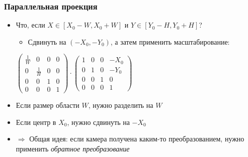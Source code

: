 \documentclass[10pt]{beamer}
\begin{document}
\begin{frame}[fragile]
\frametitle{Параллельная проекция}
\begin{itemize}
\item Что, если \begin{math}X \in [X_0 - W, X_0 + W]\end{math} и \begin{math}Y \in [Y_0 - H, Y_0 + H]\end{math}?
\pause
\begin{itemize}
\item Сдвинуть на \begin{math}(-X_0, -Y_0)\end{math}, а затем применить масштабирование:
\end{itemize}
\begin{center}
\begin{math}
\begin{pmatrix}
\frac{1}{W} & 0 & 0 & 0 \\
0 & \frac{1}{H} & 0 & 0 \\
0 & 0 & 1 & 0 \\
0 & 0 & 0 & 1
\end{pmatrix}
\cdot
\begin{pmatrix}
1 & 0 & 0 & -X_0 \\
0 & 1 & 0 & -Y_0 \\
0 & 0 & 1 & 0 \\
0 & 0 & 0 & 1
\end{pmatrix}
\end{math}
\end{center}
\pause
\item Если размер области \begin{math}W\end{math}, нужно разделить на \begin{math}W\end{math}
\pause
\item Если центр в \begin{math}X_0\end{math}, нужно сдвинуть на \begin{math}-X_0\end{math}
\pause
\item \begin{math}\Longrightarrow\end{math} Общая идея: если камера получена каким-то преобразованием, нужно применить \textit{обратное преобразование}
\end{itemize}
\end{frame}
\end{document}
